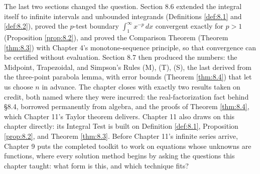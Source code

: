 \documentclass[a4paper,12pt,oneside]{memoir}
\begin{document}
The last two sections changed the question. Section 8.6 extended the integral itself to infinite intervals and unbounded integrands (Definitions \ref{def:8.1} and \ref{def:8.2}), proved the \(p\)-test boundary \(\int_{1}^{\infty} x^{-p}\,dx\) convergent exactly for \(p > 1\) (Proposition \ref{prop:8.2}), and proved the Comparison Theorem (Theorem \ref{thm:8.3}) with Chapter 4’s monotone-sequence principle, so that convergence can be certified without evaluation. Section 8.7 then produced the numbers: the Midpoint, Trapezoidal, and Simpson’s Rules (M), (T), (S), the last derived from the three-point parabola lemma, with error bounds (Theorem \ref{thm:8.4}) that let us choose \(n\) in advance. The chapter closes with exactly two results taken on credit, both named where they were incurred: the real-factorization fact behind §8.4, borrowed permanently from algebra, and the proofs of Theorem \ref{thm:8.4}, which Chapter 11’s Taylor theorem delivers. Chapter 11 also draws on this chapter directly: its Integral Test is built on Definition \ref{def:8.1}, Proposition \ref{prop:8.2}, and Theorem \ref{thm:8.3}. Before Chapter 11’s infinite series arrive, Chapter 9 puts the completed toolkit to work on equations whose unknowns are functions, where every solution method begins by asking the questions this chapter taught: what form is this, and which technique fits?
\end{document}
